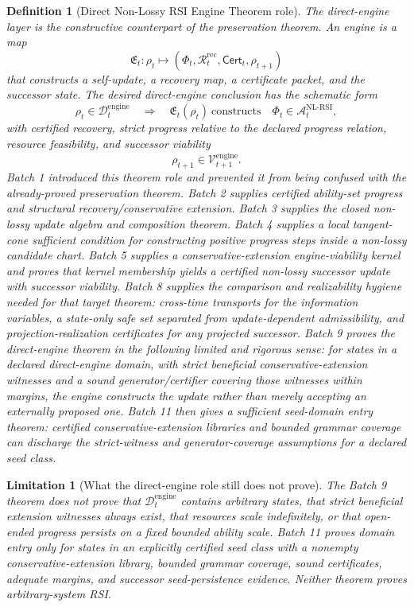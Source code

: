 \documentclass[11pt]{article}
\newtheorem{definition}[theorem]{Definition}
\newtheorem{limitation}[theorem]{Limitation}
\newcommand{\Acal}{\mathcal{A}}
\newcommand{\Rcal}{\mathcal{R}}
\newcommand{\1}{\mathbf{1}}
\providecommand{\Dcal}{\mathcal{D}}
\providecommand{\Vcal}{\mathcal{V}}
\begin{document}
\begin{definition}[Direct Non-Lossy RSI Engine Theorem role]
\label{def:direct_nl_rsi_engine_target}
The direct-engine layer is the constructive counterpart of the preservation theorem.  An engine is a map
\[
\mathfrak E_t:
\rho_t\longmapsto
(\Phi_t,\Rcal_t^{\mathrm{rec}},\mathsf{Cert}_t,\rho_{t+1})
\]
that constructs a self-update, a recovery map, a certificate packet, and the successor state.  The desired direct-engine conclusion has the schematic form
\[
\rho_t\in\Dcal_t^{\mathrm{engine}}
\quad\Longrightarrow\quad
\mathfrak E_t(\rho_t)\ \text{constructs}\quad
\Phi_t\in\Acal_t^{\mathrm{NL\mbox{-}RSI}},
\]
with certified recovery, strict progress relative to the declared progress relation, resource feasibility, and successor viability
\[
\rho_{t+1}\in\Vcal_{t+1}^{\mathrm{engine}}.
\]
Batch 1 introduced this theorem role and prevented it from being confused with the already-proved preservation theorem. Batch 2 supplies certified ability-set progress and structural recovery/conservative extension. Batch 3 supplies the closed non-lossy update algebra and composition theorem. Batch 4 supplies a local tangent-cone sufficient condition for constructing positive progress steps inside a non-lossy candidate chart. Batch 5 supplies a conservative-extension engine-viability kernel and proves that kernel membership yields a certified non-lossy successor update with successor viability. Batch 8 supplies the comparison and realizability hygiene needed for that target theorem: cross-time transports for the information variables, a state-only safe set separated from update-dependent admissibility, and projection-realization certificates for any projected successor. Batch 9 proves the direct-engine theorem in the following limited and rigorous sense: for states in a declared direct-engine domain, with strict beneficial conservative-extension witnesses and a sound generator/certifier covering those witnesses within margins, the engine constructs the update rather than merely accepting an externally proposed one. Batch 11 then gives a sufficient seed-domain entry theorem: certified conservative-extension libraries and bounded grammar coverage can discharge the strict-witness and generator-coverage assumptions for a declared seed class.
\end{definition}

\begin{limitation}[What the direct-engine role still does not prove]
The Batch 9 theorem does not prove that \(\Dcal_t^{\mathrm{engine}}\) contains arbitrary states, that strict beneficial extension witnesses always exist, that resources scale indefinitely, or that open-ended progress persists on a fixed bounded ability scale.  Batch 11 proves domain entry only for states in an explicitly certified seed class with a nonempty conservative-extension library, bounded grammar coverage, sound certificates, adequate margins, and successor seed-persistence evidence.  Neither theorem proves arbitrary-system RSI.
\end{limitation}
\end{document}
